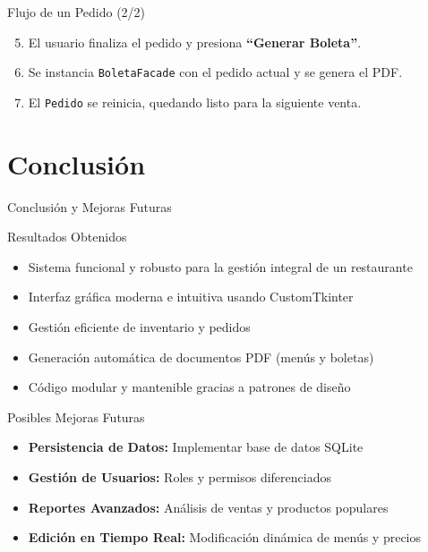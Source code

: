 \documentclass[12pt]{beamer}
\begin{document}
\begin{frame}{Flujo de un Pedido (2/2)}
  \begin{enumerate}
    \setcounter{enumi}{4}
    \item El usuario finaliza el pedido y presiona \textbf{``Generar Boleta''}.  
    \item Se instancia \texttt{BoletaFacade} con el pedido actual y se genera el PDF.  
    \item El \texttt{Pedido} se reinicia, quedando listo para la siguiente venta.
  \end{enumerate}
\end{frame}



\section{Conclusión}

\begin{frame}{Conclusión y Mejoras Futuras}
  \begin{block}{Resultados Obtenidos}
    \begin{itemize}
      \item<1-> Sistema funcional y robusto para la gestión integral de un restaurante
      \item<2-> Interfaz gráfica moderna e intuitiva usando CustomTkinter
      \item<3-> Gestión eficiente de inventario y pedidos
      \item<4-> Generación automática de documentos PDF (menús y boletas)
      \item<5-> Código modular y mantenible gracias a patrones de diseño
    \end{itemize}
  \end{block}

  \begin{block}{Posibles Mejoras Futuras}
    \begin{itemize}
      \item<6-> \textbf{Persistencia de Datos:} Implementar base de datos SQLite
      \item<7-> \textbf{Gestión de Usuarios:} Roles y permisos diferenciados
      \item<8-> \textbf{Reportes Avanzados:} Análisis de ventas y productos populares
      \item<9-> \textbf{Edición en Tiempo Real:} Modificación dinámica de menús y precios
    \end{itemize}
  \end{block}
\end{frame}
\end{document}
